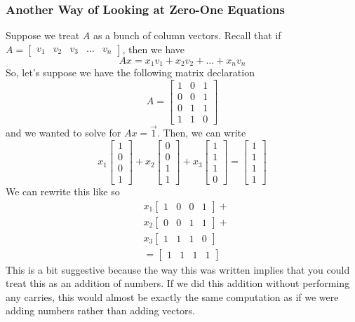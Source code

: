 \documentclass[letterpaper]{article}
\begin{document}
\subsubsection{Another Way of Looking at Zero-One Equations}
Suppose we treat $A$ as a bunch of column vectors. Recall that if $A = \begin{bmatrix}
    v_1 & v_2 & v_3 & \dots & v_n
\end{bmatrix}$, then we have 
\[Ax = x_1 v_1 + x_2 v_2 + \dots + x_n v_n\]
So, let's suppose we have the following matrix declaration 
\[A = \begin{bmatrix}
    1 & 0 & 1 \\ 0 & 0 & 1 \\ 0 & 1 & 1 \\ 1 & 1 & 0 
\end{bmatrix}\]
and we wanted to solve for $Ax = \vec{1}$. Then, we can write 
\[
    x_1 \begin{bmatrix}
        1 \\ 0 \\ 0 \\ 1
    \end{bmatrix} + x_2 \begin{bmatrix}
        0 \\ 0 \\ 1 \\ 1
    \end{bmatrix} + x_3 \begin{bmatrix}
        1 \\ 1 \\ 1\\ 0
    \end{bmatrix} = \begin{bmatrix}
        1 \\ 1 \\ 1 \\ 1
    \end{bmatrix}
\]
We can rewrite this like so 
\begin{equation*}
    \begin{aligned}
        &x_1 \begin{bmatrix}
            1 & 0 & 0 & 1
        \end{bmatrix} + \\ 
        &x_2 \begin{bmatrix}
            0 & 0 & 1 & 1
        \end{bmatrix} + \\ 
        &x_3 \begin{bmatrix}
            1 & 1 & 1 & 0
        \end{bmatrix} \\ 
        &= \begin{bmatrix}
            1 & 1 & 1 & 1
        \end{bmatrix}
    \end{aligned}
\end{equation*}
This is a bit suggestive because the way this was written implies that you could treat this as an addition of numbers. If we did this addition without performing any carries, this would almost be exactly the same computation as if we were adding numbers rather than adding vectors.
\end{document}
